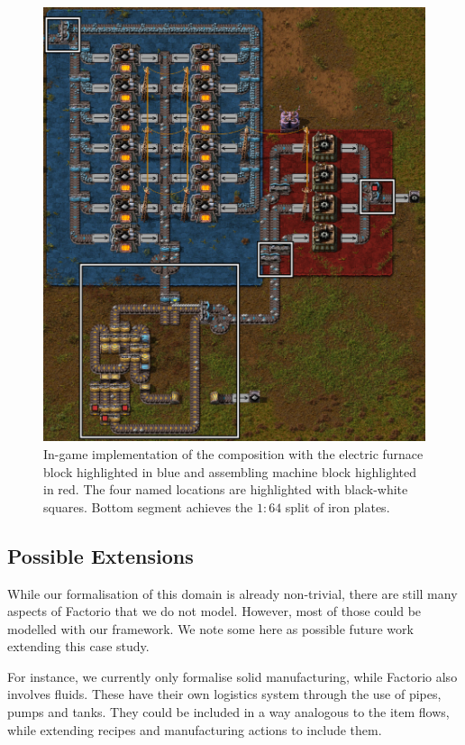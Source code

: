 \documentclass[class=smolathesis,crop=false]{standalone}
\begin{document}
\begin{figure}[htbp]
  \centering
  \includegraphics[width=\textwidth]{img/factorio_four-gears.png}
  \caption{In-game implementation of the  composition with the electric furnace block highlighted in blue and assembling machine block highlighted in red. The four named locations are highlighted with black-white squares. Bottom segment achieves the $1:64$ split of iron plates.}
  \label{fig:factorio_four-gears}
\end{figure}

\subsection{Possible Extensions}
\label{sec:cases/factorio/extensions}

While our formalisation of this domain is already non-trivial, there are still many aspects of Factorio that we do not model.
However, most of those could be modelled with our framework.
We note some here as possible future work extending this case study.

For instance, we currently only formalise solid manufacturing, while Factorio also involves fluids.
These have their own logistics system through the use of pipes, pumps and tanks.
They could be included in a way analogous to the item flows, while extending recipes and manufacturing actions to include them.
\end{document}
